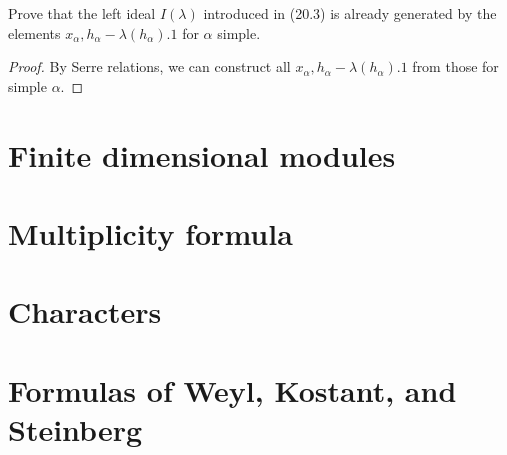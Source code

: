 \begin{ex}
	Prove that the left ideal $I(\lambda)$ introduced in (20.3) is already generated by the elements $x_{\alpha}, h_{\alpha}-\lambda(h_{\alpha}).1$ for $\alpha$ simple.
\end{ex}
\begin{proof}
	By Serre relations, we can construct all $x_{\alpha}, h_{\alpha}-\lambda(h_{\alpha}).1$ from those for simple $\alpha$.
\end{proof}


\section{Finite dimensional modules}

\section{Multiplicity formula}

\section{Characters}

\section{Formulas of Weyl, Kostant, and Steinberg}